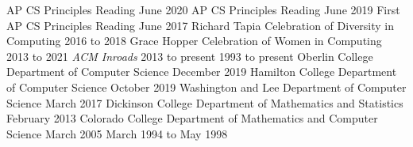 
\begin{cventries}

    {AP CS Principles Reading}
    {June 2020}
    {AP CS Principles Reading}
    {June 2019}
    {First AP CS Principles Reading}
    {June 2017}
    {Richard Tapia Celebration of Diversity in Computing}
    {2016 to 2018}
    {Grace Hopper Celebration of Women in Computing}
    {2013 to 2021}
    {\textsl{ACM Inroads}}
    {2013 to present}
    {}
    {1993 to present}
    {Oberlin College Department of Computer Science}
    {December 2019}
    {Hamilton College Department of Computer Science}
    {October 2019}
    {Washington and Lee Department of Computer Science}
    {March 2017}
    {Dickinson College Department of Mathematics and Statistics}
    {February 2013}
    {Colorado College Department of Mathematics and Computer Science}
    {March 2005}
    {}
    {March 1994 to May 1998}

\end{cventries}

